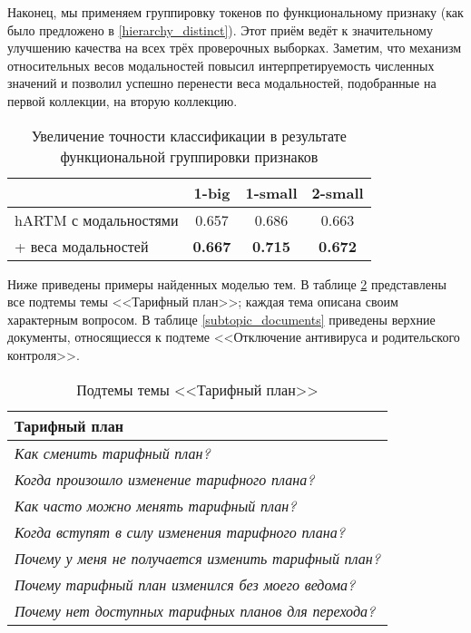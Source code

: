 Наконец, мы применяем группировку токенов по функциональному признаку (как было предложено в \ref{hierarchy_distinct}). Этот приём ведёт к значительному улучшению качества на всех трёх проверочных выборках. Заметим, что механизм относительных весов модальностей повысил интерпретируемость численных значений и позволил успешно перенести веса модальностей, подобранные на первой коллекции, на вторую коллекцию.

\begin{table}[!h] 
    \centering 
\begin{tabular}{p{3.7cm}|c|c|c}
    \hline
    & 1-big            & 1-small            & 2-small            \\ \hline
    hARTM с модальностями         & 0.657          & 0.686          & 0.663          \\
    + веса модальностей & \textbf{0.667} & \textbf{0.715} & \textbf{0.672} \\ \hline
\end{tabular}
    \caption{Увеличение точности классификации в результате функциональной группировки признаков}
    \label{results}
\end{table}

Ниже приведены примеры найденных моделью тем. В таблице \ref{topic_subtopic} представлены все подтемы темы <<Тарифный план>>; каждая тема описана своим характерным вопросом. В таблице \ref{subtopic_documents} приведены верхние документы, относящиесся к подтеме <<Отключение антивируса и родительского контроля>>.

\begin{table}[!h]
\begin{tabular}{p{7cm}}
  \hline
  \textbf{Тарифный план} \\
  \hline
  \textsl{Как сменить тарифный план?} \\
  \textsl{Когда произошло изменение тарифного плана?} \\
  \textsl{Как часто можно менять тарифный план?} \\
  \textsl{Когда вступят в силу изменения тарифного плана?} \\
  \textsl{Почему у меня не получается изменить тарифный план?} \\
  \textsl{Почему тарифный план изменился без моего ведома?} \\
  \textsl{Почему нет доступных тарифных планов для перехода?} \\
  \hline
\end{tabular}
\caption{Подтемы темы <<Тарифный план>>}
\label{topic_subtopic}
\end{table}

